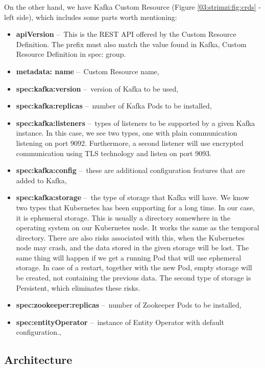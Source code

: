 On the other hand, we have Kafka Custom Resource (Figure \ref{03:strimzi:fig:crds} - left side), which includes some parts worth mentioning:
\begin{itemize}[itemsep=1mm, parsep=0pt]
  \item \textbf{apiVersion} \---\ This is the REST API offered by the Custom Resource Definition. The prefix must also match the value found in Kafka, Custom Resource Definition in spec: group. 
  \item \textbf{metadata: name} \---\ Custom Resource name,
  \item \textbf{spec:kafka:version} \---\ version of Kafka to be used,
  \item \textbf{spec:kafka:replicas} \---\ number of Kafka Pods to be installed,
  \item \textbf{spec:kafka:listeners} \---\ types of listeners to be supported by a given Kafka instance. In this case, we see two types, one with plain communication listening on port 9092. Furthermore, a second listener will use encrypted communication using TLS technology and listen on port 9093.
  \item  \textbf{spec:kafka:config} \---\ these are additional configuration features that are added to Kafka,
  \item  \textbf{spec:kafka:storage} \cite{strimziStorageBlogPost} \---\ the type of storage that Kafka will have. We know two types that Kubernetes has been supporting for a long time. In our case, it is ephemeral storage. This is usually a directory somewhere in the operating system on our Kubernetes node. It works the same as the temporal directory. There are also risks associated with this, when the Kubernetes node may crash, and the data stored in the given storage will be lost. The same thing will happen if we get a running Pod that will use ephemeral storage. In case of a restart, together with the new Pod, empty storage will be created, not containing the previous data. The second type of storage is Persistent, which eliminates these risks. 
  \item \textbf{spec:zookeeper:replicas} \---\ number of Zookeeper Pods to be installed,
  \item \textbf{spec:entityOperator} \---\ instance of Entity Operator with default configuration.,
\end{itemize}

\subsection*{Architecture}

